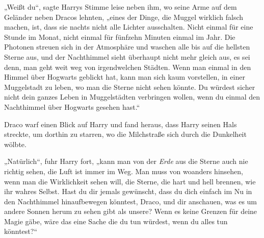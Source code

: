 „Weißt du“, sagte Harrys Stimme leise neben ihm, wo seine Arme auf dem Geländer neben Dracos lehnten, „eines der Dinge, die Muggel wirklich falsch machen, ist, dass sie nachts nicht alle Lichter ausschalten. Nicht einmal für eine Stunde im Monat, nicht einmal für fünfzehn Minuten einmal im Jahr. Die Photonen streuen sich in der Atmosphäre und waschen alle bis auf die hellsten Sterne aus, und der Nachthimmel sieht überhaupt nicht mehr gleich aus, es sei denn, man geht weit weg von irgendwelchen Städten. Wenn man einmal in den Himmel über Hogwarts geblickt hat, kann man sich kaum vorstellen, in einer Muggelstadt zu leben, wo man die Sterne nicht sehen könnte. Du würdest sicher nicht dein ganzes Leben in Muggelstädten verbringen wollen, wenn du einmal den Nachthimmel über Hogwarts gesehen hast.“

Draco warf einen Blick auf Harry und fand heraus, dass Harry seinen Hals streckte, um dorthin zu starren, wo die Milchstraße sich durch die Dunkelheit wölbte.

„Natürlich“, fuhr Harry fort, „kann man von der \emph{Erde} aus die Sterne auch nie richtig sehen, die Luft ist immer im Weg. Man muss von woanders hinsehen, wenn man die Wirklichkeit sehen will, die Sterne, die hart und hell brennen, wie ihr wahres Selbst. Hast du dir jemals gewünscht, dass du dich einfach im Nu in den Nachthimmel hinaufbewegen könntest, Draco, und dir anschauen, was es um andere Sonnen herum zu sehen gibt als unsere? Wenn es keine Grenzen für deine Magie gäbe, wäre das eine Sache die du tun würdest, wenn du alles tun könntest?“


